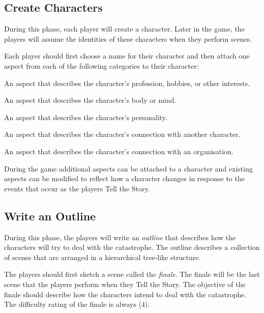 \documentclass[12pt, a5paper, parskip=half-]{scrartcl}
\begin{document}
\newpage

\subsection*{Create Characters}
During this phase, each player will create a character.
Later in the game, the players will assume the identities of these characters when they perform scenes.

Each player should first choose a name for their character and then attach one aspect from each of the following categories to their character:
\begin{description}[labelindent=0.25cm, leftmargin=\widthof{\hspace{0.25cm}\textbullet\space}, font=\normalfont\textbullet\bfseries\space]
   \item[Occupation]
     An aspect that describes the character's profession, hobbies, or other interests.
   \item[Physical or Mental Characteristic]
     An aspect that describes the character's body or mind.
   \item[Psychological Characteristic]
     An aspect that describes the character's personality.
   \item[Relationship]
     An aspect that describes the character's connection with another character.
   \item[Affiliation]
     An aspect that describes the character's connection with an organisation.
\end{description}

\bigskip

During the game additional aspects can be attached to a character and existing aspects can be modified to reflect how a character changes in response to the events that occur as the players {\cinzel \small Tell the Story}.

\newpage

\subsection*{Write an Outline}
During this phase, the players will write an \emph{outline} that describes how the characters will try to deal with the catastrophe.
The outline describes a collection of scenes that are arranged in a hierarchical tree-like structure.

The players should first sketch a scene called the \emph{finale}.
The finale will be the last scene that the players perform when they {\cinzel \small Tell the Story}.
The objective of the finale should describe how the characters intend to deal with the catastrophe.
The difficulty rating of the finale is always (4).
\end{document}
